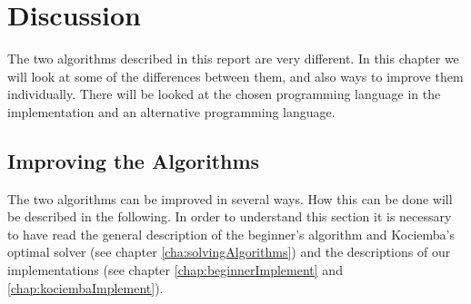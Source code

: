 \chapter{Discussion}
\emptyTop{}
The two algorithms described in this report are very different.
In this chapter we will look at some of the differences between them, and also ways to improve them individually. 
There will be looked at the chosen programming language in the implementation and an alternative programming language.





\section{Improving the Algorithms}
The two algorithms can be improved in several ways. How this can be done will be described in the following.
In order to understand this section it is necessary to have read the general description of the beginner's algorithm and Kociemba's optimal solver (see chapter \ref{cha:solvingAlgorithms}) and the descriptions of our implementations (see chapter \ref{chap:beginnerImplement} and \ref{chap:kociembaImplement}).




